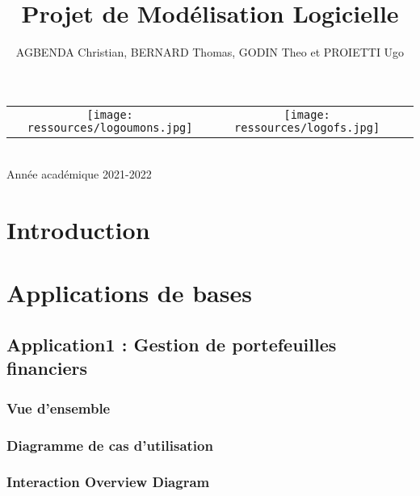 \documentclass{article}
\begin{document}
\begin{titlepage}
\begin{center}
        \begin{center}
            \begin{tabular}[t]{c c c}
                \texttt{[image: ressources/logoumons.jpg]} &
                \texttt{[image: ressources/logofs.jpg]} &
            \end{tabular}
        \end{center}~\\
        
        {\large Année académique 2021-2022}
        
    \end{center}
\end{titlepage}

\title{Projet de Modélisation Logicielle}
\author{AGBENDA Christian, BERNARD Thomas, GODIN Theo et PROIETTI Ugo}
\maketitle
\tableofcontents
\newpage


\section{Introduction}

\section{Applications de bases}

	\subsection{Application1 : Gestion de portefeuilles financiers}

		\subsubsection{Vue d'ensemble}

		\subsubsection{Diagramme de cas d'utilisation}

		\subsubsection{Interaction Overview Diagram}
		
\end{document}
